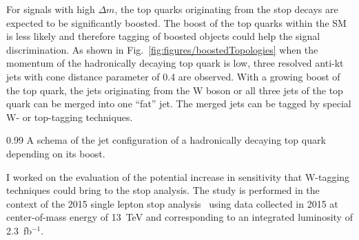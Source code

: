For signals with high  $\Delta m$, the top quarks originating from the stop decays are expected to be significantly boosted. The boost of the top quarks within the SM is less likely and therefore tagging of boosted objects could help the signal discrimination. As shown in Fig.~\ref{fig:figures/boostedTopologies} when the momentum of the hadronically decaying top quark is low, three resolved anti-kt jets with cone distance parameter of 0.4  are observed. With a growing boost of the top quark, the jets originating from the W boson or all three jets of the top quark can be merged into one ``fat'' jet. The merged jets can be tagged by special W-  or top-tagging techniques.

                 {0.99}       %
                 { A schema of the jet configuration of a hadronically decaying top quark  depending on its boost. }


I worked on the evaluation of the potential increase in sensitivity that W-tagging techniques could bring to the stop analysis. The study is performed in the context of the 2015 single lepton stop analysis~\cite{Sirunyan:2016jpr} using data collected in 2015 at center-of-mass energy of 13~TeV  and corresponding to an integrated luminosity of 2.3~fb$^{-1}$. 


